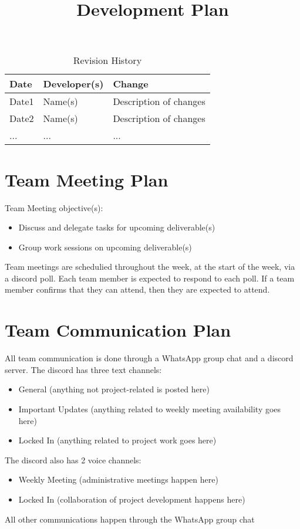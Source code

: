 \documentclass{article}
\title{Development Plan\\\progname}
\author{\authname}
\date{}
\begin{document}
\maketitle

\begin{table}[hp]
\caption{Revision History} \label{TblRevisionHistory}
\begin{tabularx}{\textwidth}{llX}
\toprule
\textbf{Date} & \textbf{Developer(s)} & \textbf{Change}\\
\midrule
Date1 & Name(s) & Description of changes\\
Date2 & Name(s) & Description of changes\\
... & ... & ...\\
\bottomrule
\end{tabularx}
\end{table}


\section{Team Meeting Plan}
Team Meeting objective(s):
\begin{itemize}
  \item Discuss and delegate tasks for upcoming deliverable(s)
  \item Group work sessions on upcoming deliverable(s)
\end{itemize}
\noindent
Team meetings are schedulied throughout the week, at the start of the week, via a discord poll.
Each team member is expected to respond to each poll. If a team member confirms that they can attend, then
they are expected to attend.
\section{Team Communication Plan}
All team communication is done through a WhatsApp group chat and a discord server. The discord has three text
channels:
\begin{itemize}
  \item General (anything not project-related is posted here)
  \item Important Updates (anything related to weekly meeting availability goes here)
  \item Locked In (anything related to project work goes here)
\end{itemize}
\noindent
The discord also has 2 voice channels:

\begin{itemize}
  \item Weekly Meeting (administrative meetings happen here)
  \item Locked In (collaboration of project development happens here)
\end{itemize}
\noindent
All other communications happen through the WhatsApp group chat
\end{document}
